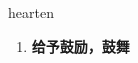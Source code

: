 
\begin{frame}
{\huge hearten}
\begin{center}
\begin{enumerate}\Large
  \item \textbf{给予鼓励，鼓舞}
\end{enumerate}
\end{center}
\end{frame}
